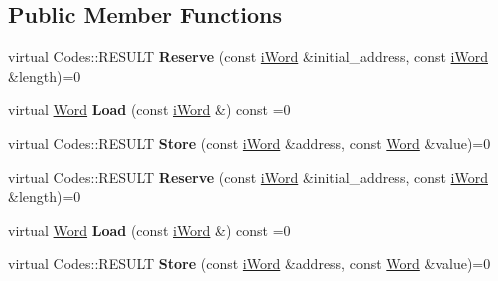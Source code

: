 \subsection*{Public Member Functions}
\begin{DoxyCompactItemize}
\item 
\hypertarget{classiMemory_a27750e74d09fb473c163a4cc4c3e697b}{
virtual Codes::RESULT {\bfseries Reserve} (const \hyperlink{classiWord}{iWord} \&initial\_\-address, const \hyperlink{classiWord}{iWord} \&length)=0}
\label{classiMemory_a27750e74d09fb473c163a4cc4c3e697b}

\item 
\hypertarget{classiMemory_a58fea9cebc1beb89503898d2d5f79bcd}{
virtual \hyperlink{classWord}{Word} {\bfseries Load} (const \hyperlink{classiWord}{iWord} \&) const =0}
\label{classiMemory_a58fea9cebc1beb89503898d2d5f79bcd}

\item 
\hypertarget{classiMemory_a2632c9999797b0799a7d6b0a59bfa91a}{
virtual Codes::RESULT {\bfseries Store} (const \hyperlink{classiWord}{iWord} \&address, const \hyperlink{classWord}{Word} \&value)=0}
\label{classiMemory_a2632c9999797b0799a7d6b0a59bfa91a}

\item 
\hypertarget{classiMemory_a27750e74d09fb473c163a4cc4c3e697b}{
virtual Codes::RESULT {\bfseries Reserve} (const \hyperlink{classiWord}{iWord} \&initial\_\-address, const \hyperlink{classiWord}{iWord} \&length)=0}
\label{classiMemory_a27750e74d09fb473c163a4cc4c3e697b}

\item 
\hypertarget{classiMemory_a58fea9cebc1beb89503898d2d5f79bcd}{
virtual \hyperlink{classWord}{Word} {\bfseries Load} (const \hyperlink{classiWord}{iWord} \&) const =0}
\label{classiMemory_a58fea9cebc1beb89503898d2d5f79bcd}

\item 
\hypertarget{classiMemory_a2632c9999797b0799a7d6b0a59bfa91a}{
virtual Codes::RESULT {\bfseries Store} (const \hyperlink{classiWord}{iWord} \&address, const \hyperlink{classWord}{Word} \&value)=0}
\label{classiMemory_a2632c9999797b0799a7d6b0a59bfa91a}

\end{DoxyCompactItemize}
